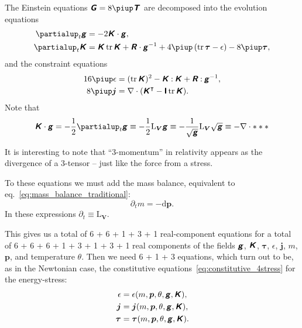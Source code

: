 \documentclass[\ifafour a4paper,12pt,\else a5paper,10pt,\fi%
onecolumn,oneside,article,%
british%
]{memoir}
\theoremstyle{remark}
\theoremstyle{innote}
\newcommand*{\mathte}[1]{\textbf{\textit{\textsf{#1}}}}
\newcommand*{\de}{\partialup}%
\newcommand*{\pu}{\piup}%
\newcommand*{\di}{\mathrm{d}}%
\DeclareMathOperator{\tr}{tr}%
\newcommand*{\con}{\mathbin{:}}%
\renewcommand*{\|}{\nonscript\,\vert\nonscript\;\mathopen{}}
\newcommand*{\eqn}{eq.}%
\newcommand*{\T}{^\intercal}%
\newcommand*{\Li}{\mathrm{L}}
\newcommand*{\ydd}{m}
\newcommand*{\yd}{\ydd}
\newcommand*{\yjj}{p}
\newcommand*{\yj}{\bm{\yjj}}
\newcommand*{\yGG}{G}
\newcommand*{\yG}{\mathte{\yGG}}
\newcommand*{\yTT}{\tau}
\newcommand*{\yT}{\bm{\yTT}}
\newcommand*{\yTTf}{T}
\newcommand*{\yTf}{\mathte{\yTTf}}
\newcommand*{\ynn}{V}
\newcommand*{\yn}{\bm{\ynn}}
\newcommand*{\ygg}{g}
\newcommand*{\yg}{\mathte{\ygg}}
\newcommand*{\yKK}{K}
\newcommand*{\yK}{\mathte{\yKK}}
\newcommand*{\yRR}{R}
\newcommand*{\yR}{\mathte{\yRR}}
\newcommand*{\ypp}{j}
\newcommand*{\yp}{\bm{\ypp}}
\newcommand*{\ye}{\epsilon}
\newcommand*{\yte}{\theta}
\newcommand*{\ynab}{\nabla}
\newcommand*{\yI}{\textsf{\textbf{I}}}
\begin{document}
The Einstein equations $\yG = 8\pu\yTf$ are decomposed into the evolution
equations
\begin{subequations}\label{eq:evolution_eqns}
  \begin{align}
    \label{eq:dt_metric}
    \de_t \yg &= -2\yK\cdot\yg,
    \\
    \label{eq:dt_curvat}
    \de_t \yK &=  \yK\tr\yK + \yR\cdot\yg^{-1} + 4\pu\,(\tr\yT-\ye) - 8\pu\yT,
  \end{align}
\end{subequations}
and the constraint equations
\begin{subequations}\label{eq:constraint_eqns}
  \begin{align}
    \label{eq:energy_constraint}
    16\pu\ye &= (\tr\yK)^2 - \yK\con\yK + \yR\con\yg^{-1},
    \\
    \label{eq:momentum_constraint}
    8\pu\yp &= \ynab\cdot(\yK\T - \yI\tr\yK).
  \end{align}
\end{subequations}
Note that
\begin{equation}
  \label{eq:curvature_stretching}
  \yK\cdot\yg = -\frac{1}{2}\de_t\yg \equiv
  -\frac{1}{2}  \Li_{\yn}\yg \equiv
  -\frac{1}{\sqrt{\yg}}\Li_{\yn}\sqrt{\yg} \equiv -\ynab\cdot ***
\end{equation}

It is interesting to note that \enquote{3-momentum} in relativity appears
as the divergence of a 3-tensor -- just like the force from a stress.

To these equations we must add the mass balance, equivalent to
\eqn~\eqref{eq:mass_balance_traditional}:
\begin{equation}
  \label{eq:mass_balance_gen-rel}
  \de_t\yd = - \di\yj.
\end{equation}
In these expressions $\de_t \equiv \Li_{\yn}$.

This gives us a total of 6 + 6 + 1 + 3 + 1 real-component equations for a
total of 6 + 6 + 6 + 1 + 3 + 1 + 3 + 1 real components of the fields $\yg$,
$\yK$, $\yT$, $\ye$, $\yp$, $\yd$, $\yj$, and temperature $\yte$. Then we
need 6 + 1 + 3 equations, which turn out to be, as in the Newtonian case,
the constitutive equations~\eqref{eq:constitutive_4stress} for the
energy-stress:
\begin{subequations}\label{eq:constitutive_4stress_gen-rel}
  \begin{align}
    \label{eq:constit_energy_gen-rel}
    \ye &= \ye(\yd,\yj,\yte,\yg, \yK),
    \\
    \label{eq:constit_energy-flux_gen-rel}
    \yp &= \yp(\yd,\yj,\yte,\yg, \yK),
    \\
    \label{eq:constit_3stress_gen-rel}
    \yT &= \yT(\yd,\yj,\yte,\yg, \yK).
  \end{align}
\end{subequations}
\end{document}
